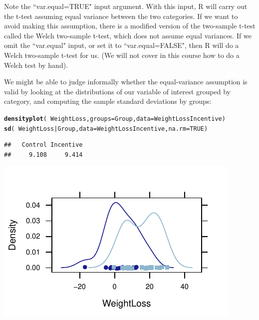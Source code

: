 \documentclass[twoside]{book}\usepackage[]{graphicx}\usepackage[]{xcolor}
\makeatletter
\def\maxwidth{ %
  \ifdim\Gin@nat@width>\linewidth
    \linewidth
  \else
    \Gin@nat@width
  \fi
}
\newcommand{\hlnum}[1]{\textcolor[rgb]{0.686,0.059,0.569}{#1}}%
\newcommand{\hlopt}[1]{\textcolor[rgb]{0,0,0}{#1}}%
\newcommand{\hlstd}[1]{\textcolor[rgb]{0.345,0.345,0.345}{#1}}%
\newcommand{\hlkwc}[1]{\textcolor[rgb]{0.333,0.667,0.333}{#1}}%
\newcommand{\hlkwd}[1]{\textcolor[rgb]{0.737,0.353,0.396}{\textbf{#1}}}%
\newenvironment{kframe}{%
 \def\at@end@of@kframe{}%
 \ifinner\ifhmode%
  \def\at@end@of@kframe{\end{minipage}}%
  \begin{minipage}{\columnwidth}%
 \fi\fi%
 \def\FrameCommand##1{\hskip\@totalleftmargin \hskip-\fboxsep
 \colorbox{shadecolor}{##1}\hskip-\fboxsep
     \hskip-\linewidth \hskip-\@totalleftmargin \hskip\columnwidth}%
 \MakeFramed {\advance\hsize-\width
   \@totalleftmargin\z@ \linewidth\hsize
   \@setminipage}}%
 {\par\unskip\endMakeFramed%
 \at@end@of@kframe}
\newenvironment{knitrout}{}{} %
\makeatother
\begin{document}
Note the ``var.equal=TRUE" input argument.  With this input, R will carry out the t-test assuming equal variance between the two categories.  If we want to avoid making this assumption, there is a modified version of the two-sample t-test called the Welch two-sample t-test, which does not assume equal variances.  If we omit the ``var.equal" input, or set it to ``var.equal=FALSE", then R will do a Welch two-sample t-test for us. (We will not cover in this course how to do a Welch test by hand).

We might be able to judge informally whether the equal-variance assumption is valid by looking at the distributions of our variable of interest grouped by category, and computing the sample standard deviations by groups:
\begin{knitrout}
\color{fgcolor}\begin{kframe}
\begin{alltt}
\hlkwd{densityplot}\hlstd{(}\hlopt{~} \hlstd{WeightLoss,} \hlkwc{groups} \hlstd{= Group,} \hlkwc{data} \hlstd{= WeightLossIncentive)}
\hlkwd{sd}\hlstd{(} \hlopt{~} \hlstd{WeightLoss} \hlopt{|} \hlstd{Group,} \hlkwc{data} \hlstd{= WeightLossIncentive,} \hlkwc{na.rm} \hlstd{=} \hlnum{TRUE}\hlstd{)}
\end{alltt}
\begin{verbatim}
##   Control Incentive 
##     9.108     9.414
\end{verbatim}
\end{kframe}

{\centering \includegraphics[width=\maxwidth]{figures/fig-unnamed-chunk-309-1} 

}



\end{knitrout}
\end{document}
